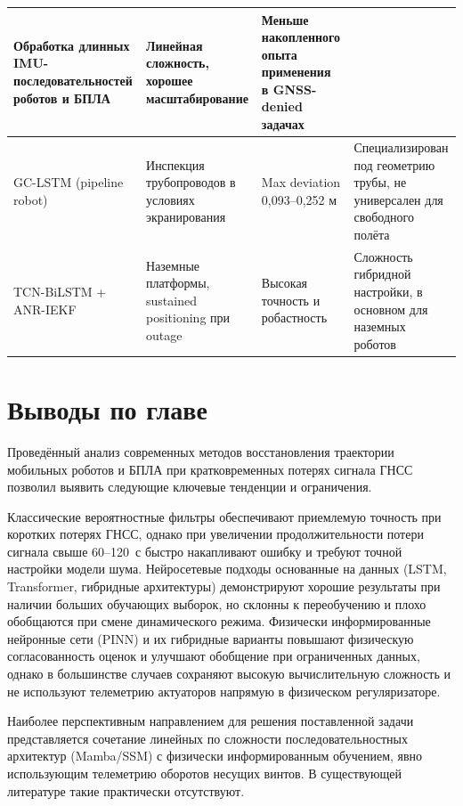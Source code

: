 \begin{table}[htbp]
{\begin{tabular}{|p{2.9cm}|p{3.5cm}|p{3.1cm}|p{5.2cm}|}
			Обработка длинных IMU-последовательностей роботов и БПЛА &
			Линейная сложность, хорошее масштабирование &
			Меньше накопленного опыта применения в GNSS-denied задачах \\
			\hline
			GC-LSTM (pipeline robot) \cite{Wang2025} &
			Инспекция трубопроводов в условиях экранирования &
			Max deviation 0,093–0,252 м &
			Специализирован под геометрию трубы, не универсален для свободного полёта \\
			\hline
			TCN-BiLSTM + ANR-IEKF \cite{Niu2026} &
			Наземные платформы, sustained positioning при outage &
			Высокая точность и робастность &
			Сложность гибридной настройки, в основном для наземных роботов \\
			\hline
		\end{tabular}
	}
\end{table}

\section{Выводы по главе}
\label{sec:1.9}

Проведённый анализ современных методов восстановления траектории мобильных роботов и БПЛА при кратковременных потерях сигнала ГНСС позволил выявить следующие ключевые тенденции и ограничения.

Классические вероятностные фильтры обеспечивают приемлемую точность при коротких потерях ГНСС, однако при увеличении продолжительности потери сигнала свыше 60–120~с быстро накапливают ошибку и требуют точной настройки модели шума. Нейросетевые подходы основанные на данных (LSTM, Transformer, гибридные архитектуры) демонстрируют хорошие результаты при наличии больших обучающих выборок, но склонны к переобучению и плохо обобщаются при смене динамического режима. Физически информированные нейронные сети (PINN) и их гибридные варианты повышают физическую согласованность оценок и улучшают обобщение при ограниченных данных, однако в большинстве случаев сохраняют высокую вычислительную сложность и не используют телеметрию актуаторов напрямую в физическом регуляризаторе.

Наиболее перспективным направлением для решения поставленной задачи представляется сочетание линейных по сложности последовательностных архитектур (Mamba/SSM) с физически информированным обучением, явно использующим телеметрию оборотов несущих винтов. В существующей литературе такие практически отсутствуют.




